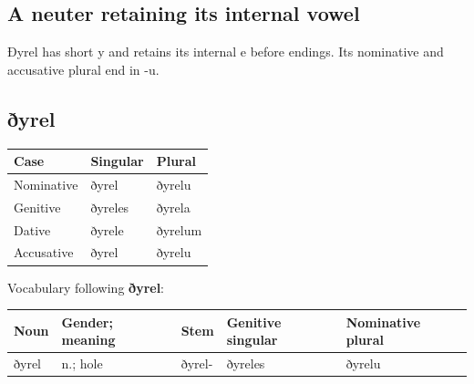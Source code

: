 \subsection*{A neuter retaining its internal vowel}

Ðyrel has short y and retains its internal e before endings. Its nominative and accusative plural end in -u.

\subsection*{ðyrel}

\par\begingroup
\fontsize{10.5}{13.2}\selectfont
\setlength{\LTleft}{0pt}\setlength{\LTright}{\fill}
\noindent
\begin{tabular}{@{}>{\raggedright\arraybackslash}p{39.46mm}>{\raggedright\arraybackslash}p{39.46mm}>{\raggedright\arraybackslash}p{39.46mm}@{}}
\toprule
\textbf{Case} & \textbf{Singular} & \textbf{Plural} \\
\midrule
Nominative & ðyrel & ðyrelu \\
Genitive & ðyreles & ðyrela \\
Dative & ðyrele & ðyrelum \\
Accusative & ðyrel & ðyrelu \\
\bottomrule
\end{tabular}
\par\endgroup

Vocabulary following \textbf{ðyrel}:

\par\begingroup
\fontsize{10.5}{13.2}\selectfont
\setlength{\LTleft}{0pt}\setlength{\LTright}{\fill}
\noindent
\begin{tabular}{@{}>{\raggedright\arraybackslash}p{20.21mm}>{\raggedright\arraybackslash}p{21.42mm}>{\raggedright\arraybackslash}p{20.21mm}>{\raggedright\arraybackslash}p{24.35mm}>{\raggedright\arraybackslash}p{26.57mm}@{}}
\toprule
\textbf{Noun} & \textbf{Gender; meaning} & \textbf{Stem} & \textbf{Genitive singular} & \textbf{Nominative plural} \\
\midrule
ðyrel & n.; hole & ðyrel- & ðyreles & ðyrelu \\
\bottomrule
\end{tabular}
\par\endgroup

